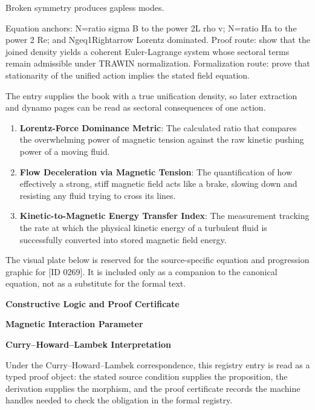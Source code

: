 Broken symmetry produces gapless modes.

Equation anchors: N=ratio sigma B to the power 2L rho v; N=ratio Ha to the power 2 Re; and Ngeq1Rightarrow Lorentz dominated. Proof route: show that the joined density yields a coherent Euler-Lagrange system whose sectoral terms remain admissible under TRAWIN normalization. Formalization route: prove that stationarity of the unified action implies the stated field equation.

The entry supplies the book with a true unification density, so later extraction and dynamo pages can be read as sectoral consequences of one action.
\endgroup

\begin{enumerate}[leftmargin=1.6em,itemsep=6pt,topsep=4pt]
\item \textbf{Lorentz-Force Dominance Metric}: The calculated ratio that compares the overwhelming power of magnetic tension against the raw kinetic pushing power of a moving fluid.
\item \textbf{Flow Deceleration via Magnetic Tension}: The quantification of how effectively a strong, stiff magnetic field acts like a brake, slowing down and resisting any fluid trying to cross its lines.
\item \textbf{Kinetic-to-Magnetic Energy Transfer Index}: The measurement tracking the rate at which the physical kinetic energy of a turbulent fluid is successfully converted into stored magnetic field energy.
\end{enumerate}

\begingroup\footnotesize\sloppy
The visual plate below is reserved for the source-specific equation and progression graphic for [ID 0269]. It is included only as a companion to the canonical equation, not as a substitute for the formal text.
\par\endgroup
\ifTZPDarkEdition
{}
\fi

\clearpage
\begingroup\tzpsupportsetup
\noindent\textbf{\fontsize{10.8pt}{12.8pt}\selectfont [ID 0269] Constructive Logic and Proof Certificate}\par
\noindent\textbf{\fontsize{10pt}{12pt}\selectfont Magnetic Interaction Parameter}\par
\vspace{0.45em}
\begingroup
\footnotesize
\setlength{\parskip}{0.22em}
\setlength{\parindent}{0pt}
\noindent\textbf{Curry--Howard--Lambek Interpretation}\par
Under the Curry--Howard--Lambek correspondence, this registry entry is read as a typed proof
object: the stated source condition supplies the proposition, the derivation supplies the
morphism, and the proof certificate records the machine handles needed to check the obligation
in the formal registry.

